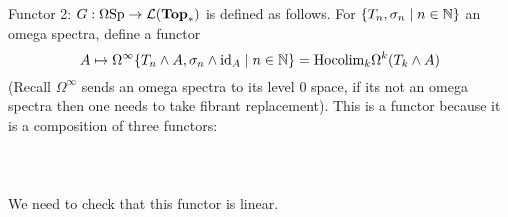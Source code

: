 \documentclass[a4paper]{article}
\begin{document}
Functor 2: $G:\Omega\text{Sp}\to\mathcal{L}(\bold{Top}_\ast)$ is defined as follows. For $\{T_n, \sigma_n\;|\;n\in\mathbb{N}\}$ an omega spectra, define a functor $$A\mapsto\Omega^\infty\{T_n\wedge A,\sigma_n\wedge\text{id}_A\;|\;n\in\mathbb{N}\}=\text{Hocolim}_k\Omega^k(T_k\wedge A)$$ (Recall $\Omega^\infty$ sends an omega spectra to its level 0 space, if its not an omega spectra then one needs to take fibrant replacement). This is a functor because it is a composition of three functors: \\~\\
\\~\\
We need to check that this functor is linear. 
\end{document}
